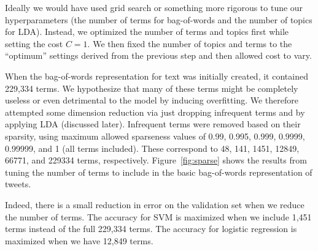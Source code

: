 \documentclass{sig-alternate-05-2015}
\begin{document}
Ideally we would have used grid search or something more rigorous to tune our hyperparameters (the number of terms for bag-of-words and the number of topics for LDA). Instead, we optimized the number of terms and topics first while setting the cost $C=1$. We then fixed the number of topics and terms to the ``optimum'' settings derived from the previous step and then allowed cost to vary.

When the bag-of-words representation for text was initially created, it contained 229,334 terms. We hypothesize that many of these terms might be completely useless or even detrimental to the model by inducing overfitting. We therefore attempted some dimension reduction via just dropping infrequent terms and by applying LDA (discussed later). Infrequent terms were removed based on their sparsity, using maximum allowed sparseness values of 0.99, 0.995, 0.999, 0.9999, 0.99999, and 1 (all terms included). These correspond to 48, 141, 1451, 12849, 66771, and 229334 terms, respectively. Figure~\ref{fig:sparse} shows the results from tuning the number of terms to include in the basic bag-of-words representation of tweets. 

Indeed, there is a small reduction in error on the validation set when we reduce the number of terms. The accuracy for SVM is maximized when we include 1,451 terms instead of the full 229,334 terms. The accuracy for logistic regression is maximized when we have 12,849 terms.
\end{document}
